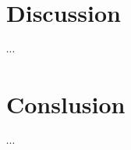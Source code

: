 \documentclass[12pt,a4paper]{article}
\begin{document}
%
%
\section{Discussion} \label{Discussion}
%
$\cdots$
%
\section{Conslusion} \label{Conclusion}
%
$\cdots$
%
\end{document}
